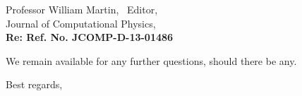 \begin{letter}{Professor William Martin, \  Editor,\\
    Journal of Computational Physics,\\
\textbf{Re: Ref. No. JCOMP-D-13-01486}}
\bigskip

We remain available for any further questions, should there be any.
\vspace{0.25cm}



\closing{Best regards, }

\end{letter}



